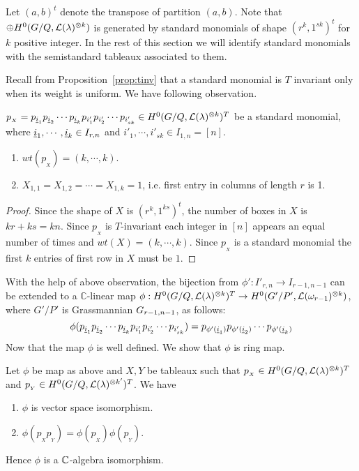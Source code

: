 Let  \((a,b)^t\) denote the transpose of partition \((a,b)\).  Note that \(\oplus H^0(G/Q,{\cal L}(\lambda)^{\otimes k})\) is generated by standard monomials of shape \((r^k,1^{sk})^t\) for \(k\) positive integer.  In the rest of this section we will identify standard monomials with the semistandard tableaux associated to them.

Recall from Proposition~\ref{prop:tinv} that a standard monomial is $T$ invariant only when its weight is uniform. We have following observation.

\begin{observation}
    \(p_{_X} = p_{{\underline i}_1}p_{{\underline i}_2}\cdots p_{{\underline i}_k} p_{i'_1}p_{i'_2}\cdots p_{i'_{sk}} \in H^0(G/Q,{\cal L}(\lambda)^{\otimes k})^T\) be a standard monomial, where \({\underline i}_1,\cdots,{\underline i}_k \in I_{r,n}\) and \(i'_1,\cdots, i'_{sk} \in I_{1,n} = [n]\).
\begin{enumerate}
    \item \(wt(p_{_X}) = (k,\cdots,k)\).
    \item \(X_{1,1} = X_{1,2} = \cdots = X_{1,k} = 1\), i.e. first entry in columns of length \(r\) is 1.
\end{enumerate}
\end{observation}
\begin{proof}
    Since the shape of \(X\) is \((r^k,1^{ks})^t\), the number of boxes in \(X\) is \(kr+ks=kn\). Since \(p_{_X}\) is \(T\)-invariant each integer in \([n]\) appears an equal number of times and \(wt(X) = (k,\cdots,k)\). Since \(p_{_X}\) is a standard monomial the first \(k\) entries of first row in $X$ must be \(1\).
\end{proof}
With the help of above observation, the bijection from \(\phi':I'_{r,n}\to I_{r-1,n-1}\) can be extended to a ${\mathbb C}$-linear map \(\phi:H^0(G/Q,{\cal L}(\lambda)^{\otimes k})^T \to H^0(G'/P',{\cal L}(\omega_{r-1})^{\otimes k})\), where \(G'/P'\) is Grassmannian \(G_{{r-1},{n-1}}\), as follows:
    \[\phi(p_{{\underline i}_1}p_{{\underline i}_2}\cdots p_{{\underline i}_k} p_{i'_1}p_{i'_2}\cdots p_{i'_{sk}})
    = p_{\phi'({\underline i}_1)}p_{\phi'({\underline i}_2)}\cdots p_{\phi'({\underline i}_k)}\] 
Now that the map \(\phi\) is well defined. We show that \(\phi\) is ring map.
\begin{lemma}
    Let \(\phi\) be map as above and \(X,Y\) be tableaux such that
    \(p_{_X} \in H^0(G/Q,{\cal L}(\lambda)^{\otimes k})^T\) 
    and \(p_{_Y} \in H^0(G/Q,{\cal L}(\lambda)^{\otimes k'})^T\). 
    We have
    \begin{enumerate}
        \item \(\phi\) is vector space isomorphism.
        \item \(\phi(p_{_X}p_{_Y}) = \phi(p_{_X})\phi(p_{_Y})\).
    \end{enumerate}
    Hence \(\phi\) is a \(\mathbb{C}\)-algebra isomorphism.
\end{lemma}
